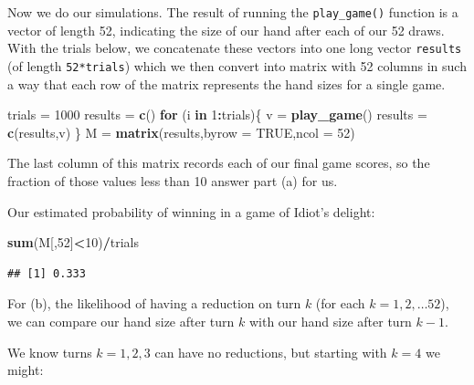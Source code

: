 \documentclass[
]{book}
\newenvironment{Shaded}{\begin{snugshade}}{\end{snugshade}}
\newcommand{\AttributeTok}[1]{\textcolor[rgb]{0.13,0.29,0.53}{#1}}
\newcommand{\ConstantTok}[1]{\textcolor[rgb]{0.56,0.35,0.01}{#1}}
\newcommand{\ControlFlowTok}[1]{\textcolor[rgb]{0.13,0.29,0.53}{\textbf{#1}}}
\newcommand{\DecValTok}[1]{\textcolor[rgb]{0.00,0.00,0.81}{#1}}
\newcommand{\FunctionTok}[1]{\textcolor[rgb]{0.13,0.29,0.53}{\textbf{#1}}}
\newcommand{\NormalTok}[1]{#1}
\newcommand{\OtherTok}[1]{\textcolor[rgb]{0.56,0.35,0.01}{#1}}
\newcommand{\SpecialCharTok}[1]{\textcolor[rgb]{0.81,0.36,0.00}{\textbf{#1}}}
\theoremstyle{definition}
\theoremstyle{definition}
\theoremstyle{definition}
\theoremstyle{definition}
\theoremstyle{remark}
\begin{document}
Now we do our simulations. The result of running the \texttt{play\_game()} function is a vector of length 52, indicating the size of our hand after each of our 52 draws. With the trials below, we concatenate these vectors into one long vector \texttt{results} (of length \texttt{52*trials}) which we then convert into matrix with 52 columns in such a way that each row of the matrix represents the hand sizes for a single game.

\begin{Shaded}
\begin{Highlighting}[]
\NormalTok{trials }\OtherTok{=} \DecValTok{1000}
\NormalTok{results }\OtherTok{=} \FunctionTok{c}\NormalTok{()}
\ControlFlowTok{for}\NormalTok{ (i }\ControlFlowTok{in} \DecValTok{1}\SpecialCharTok{:}\NormalTok{trials)\{}
\NormalTok{  v }\OtherTok{=} \FunctionTok{play\_game}\NormalTok{() }
\NormalTok{  results }\OtherTok{=} \FunctionTok{c}\NormalTok{(results,v)}
\NormalTok{\}}
\NormalTok{M }\OtherTok{=} \FunctionTok{matrix}\NormalTok{(results,}\AttributeTok{byrow =} \ConstantTok{TRUE}\NormalTok{,}\AttributeTok{ncol =} \DecValTok{52}\NormalTok{)}
\end{Highlighting}
\end{Shaded}

The last column of this matrix records each of our final game scores, so the fraction of those values less than 10 answer part (a) for us.

Our estimated probability of winning in a game of Idiot's delight:

\begin{Shaded}
\begin{Highlighting}[]
\FunctionTok{sum}\NormalTok{(M[,}\DecValTok{52}\NormalTok{]}\SpecialCharTok{\textless{}}\DecValTok{10}\NormalTok{)}\SpecialCharTok{/}\NormalTok{trials}
\end{Highlighting}
\end{Shaded}

\begin{verbatim}
## [1] 0.333
\end{verbatim}

For (b), the likelihood of having a reduction on turn \(k\) (for each \(k = 1,2,\ldots 52\)), we can compare our hand size after turn \(k\) with our hand size after turn \(k-1\).

We know turns \(k = 1, 2, 3\) can have no reductions, but starting with \(k = 4\) we might:
\end{document}
